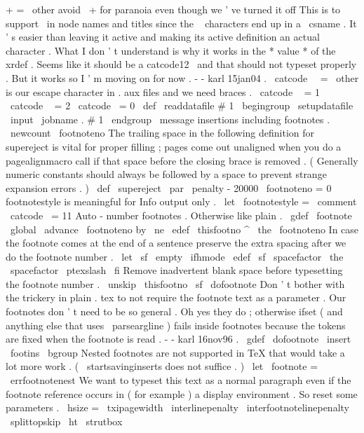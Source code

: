 {{{{{+
=
\
other
%
avoid
\
+
for
paranoia
even
though
we
'
ve
turned
it
off
%
%
This
is
to
support
\
in
node
names
and
titles
since
the
\
%
characters
end
up
in
a
\
csname
.
It
'
s
easier
than
%
leaving
it
active
and
making
its
active
definition
an
actual
\
%
character
.
What
I
don
'
t
understand
is
why
it
works
in
the
*
value
*
%
of
the
xrdef
.
Seems
like
it
should
be
a
catcode12
\
and
that
%
should
not
typeset
properly
.
But
it
works
so
I
'
m
moving
on
for
%
now
.
-
-
karl
15jan04
.
\
catcode
\
\
=
\
other
%
%
is
our
escape
character
in
.
aux
files
and
we
need
braces
.
\
catcode
\
{
=
1
\
catcode
\
}
=
2
\
catcode
\
=
0
}
\
def
\
readdatafile
#
1
{
%
\
begingroup
\
setupdatafile
\
input
\
jobname
.
#
1
\
endgroup
}
\
message
{
insertions
}
%
including
footnotes
.
\
newcount
\
footnoteno
%
The
trailing
space
in
the
following
definition
for
supereject
is
%
vital
for
proper
filling
;
pages
come
out
unaligned
when
you
do
a
%
pagealignmacro
call
if
that
space
before
the
closing
brace
is
%
removed
.
(
Generally
numeric
constants
should
always
be
followed
by
a
%
space
to
prevent
strange
expansion
errors
.
)
\
def
\
supereject
{
\
par
\
penalty
-
20000
\
footnoteno
=
0
}
%
footnotestyle
is
meaningful
for
Info
output
only
.
\
let
\
footnotestyle
=
\
comment
{
\
catcode
\
=
11
%
%
Auto
-
number
footnotes
.
Otherwise
like
plain
.
\
gdef
\
footnote
{
%
\
global
\
advance
\
footnoteno
by
\
ne
\
edef
\
thisfootno
{
^
{
\
the
\
footnoteno
}
}
%
%
%
In
case
the
footnote
comes
at
the
end
of
a
sentence
preserve
the
%
extra
spacing
after
we
do
the
footnote
number
.
\
let
\
sf
\
empty
\
ifhmode
\
edef
\
sf
{
\
spacefactor
\
the
\
spacefactor
}
\
ptexslash
\
fi
%
%
Remove
inadvertent
blank
space
before
typesetting
the
footnote
number
.
\
unskip
\
thisfootno
\
sf
\
dofootnote
}
%
%
Don
'
t
bother
with
the
trickery
in
plain
.
tex
to
not
require
the
%
footnote
text
as
a
parameter
.
Our
footnotes
don
'
t
need
to
be
so
general
.
%
%
Oh
yes
they
do
;
otherwise
ifset
(
and
anything
else
that
uses
%
\
parseargline
)
fails
inside
footnotes
because
the
tokens
are
fixed
when
%
the
footnote
is
read
.
-
-
karl
16nov96
.
%
\
gdef
\
dofootnote
{
%
\
insert
\
footins
\
bgroup
%
%
Nested
footnotes
are
not
supported
in
TeX
that
would
take
a
lot
%
more
work
.
(
\
startsavinginserts
does
not
suffice
.
)
\
let
\
footnote
=
\
errfootnotenest
%
%
We
want
to
typeset
this
text
as
a
normal
paragraph
even
if
the
%
footnote
reference
occurs
in
(
for
example
)
a
display
environment
.
%
So
reset
some
parameters
.
\
hsize
=
\
txipagewidth
\
interlinepenalty
\
interfootnotelinepenalty
\
splittopskip
\
ht
\
strutbox
}}}}}}
